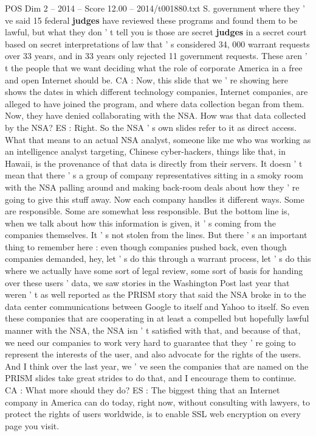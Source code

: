 \begin{textsample}{POS Dim 2 – 2014 – Score 12.00 – 2014/t001880.txt}
S. government where they ' ve said 15 federal \textbf{judges} have reviewed these programs and found them to be lawful, but what they don ' t tell you is those are secret \textbf{judges} in a secret court based on secret interpretations of law that ' s considered 34, 000 warrant requests over 33 years, and in 33 years only rejected 11 government requests.
These aren ' t the people that we want deciding what the role of corporate America in a free and open Internet should be.
CA : Now, this slide that we ' re showing here shows the dates in which different technology companies, Internet companies, are alleged to have joined the program, and where data collection began from them.
Now, they have denied collaborating with the NSA.
How was that data collected by the NSA?
ES : Right.
So the NSA ' s own slides refer to it as direct access.
What that means to an actual NSA analyst, someone like me who was working as an intelligence analyst targeting, Chinese cyber-hackers, things like that, in Hawaii, is the provenance of that data is directly from their servers.
It doesn ' t mean that there ' s a group of company representatives sitting in a smoky room with the NSA palling around and making back-room deals about how they ' re going to give this stuff away.
Now each company handles it different ways.
Some are responsible.
Some are somewhat less responsible.
But the bottom line is, when we talk about how this information is given, it ' s coming from the companies themselves.
It ' s not stolen from the lines.
But there ' s an important thing to remember here : even though companies pushed back, even though companies demanded, hey, let ' s do this through a warrant process, let ' s do this where we actually have some sort of legal review, some sort of basis for handing over these users ' data, we saw stories in the Washington Post last year that weren ' t as well reported as the PRISM story that said the NSA broke in to the data center communications between Google to itself and Yahoo to itself.
So even these companies that are cooperating in at least a compelled but hopefully lawful manner with the NSA, the NSA isn ' t satisfied with that, and because of that, we need our companies to work very hard to guarantee that they ' re going to represent the interests of the user, and also advocate for the rights of the users.
And I think over the last year, we ' ve seen the companies that are named on the PRISM slides take great strides to do that, and I encourage them to continue.
CA : What more should they do?
ES : The biggest thing that an Internet company in America can do today, right now, without consulting with lawyers, to protect the rights of users worldwide, is to enable SSL web encryption on every page you visit.

\end{textsample}
